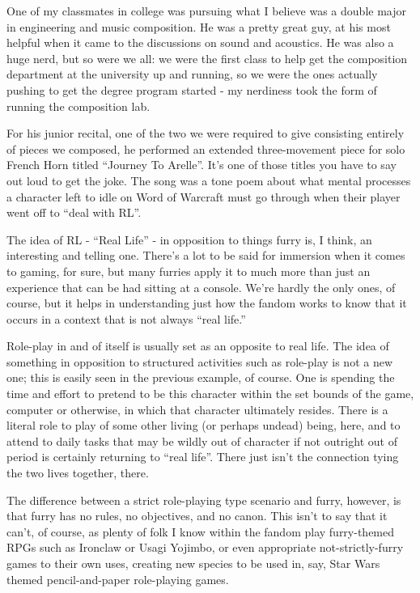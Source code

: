 
One of my classmates in college was pursuing what I believe was a double major in engineering and music composition. He was a pretty great guy, at his most helpful when it came to the discussions on sound and acoustics. He was also a huge nerd, but so were we all: we were the first class to help get the composition department at the university up and running, so we were the ones actually pushing to get the degree program started - my nerdiness took the form of running the composition lab.

For his junior recital, one of the two we were required to give consisting entirely of pieces we composed, he performed an extended three-movement piece for solo French Horn titled ``Journey To Arelle''. It's one of those titles you have to say out loud to get the joke. The song was a tone poem about what mental processes a character left to idle on Word of Warcraft must go through when their player went off to ``deal with RL''.

The idea of RL - ``Real Life'' - in opposition to things furry is, I think, an interesting and telling one. There's a lot to be said for immersion when it comes to gaming, for sure, but many furries apply it to much more than just an experience that can be had sitting at a console. We're hardly the only ones, of course, but it helps in understanding just how the fandom works to know that it occurs in a context that is not always ``real life.''

Role-play in and of itself is usually set as an opposite to real life. The idea of something in opposition to structured activities such as role-play is not a new one; this is easily seen in the previous example, of course. One is spending the time and effort to pretend to be this character within the set bounds of the game, computer or otherwise, in which that character ultimately resides. There is a literal role to play of some other living (or perhaps undead) being, here, and to attend to daily tasks that may be wildly out of character if not outright out of period is certainly returning to ``real life''. There just isn't the connection tying the two lives together, there.

The difference between a strict role-playing type scenario and furry, however, is that furry has no rules, no objectives, and no canon. This isn't to say that it can't, of course, as plenty of folk I know within the fandom play furry-themed RPGs such as Ironclaw or Usagi Yojimbo, or even appropriate not-strictly-furry games to their own uses, creating new species to be used in, say, Star Wars themed pencil-and-paper role-playing games.

